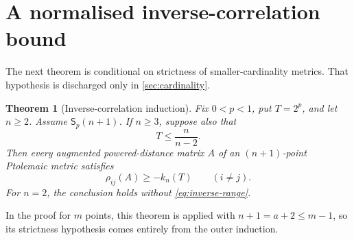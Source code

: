 \documentclass[11pt,a4paper]{article}
\newtheorem{theorem}{Theorem}[section]
\theoremstyle{definition}
\theoremstyle{remark}
\numberwithin{equation}{section}
\newcommand{\stp}{\mathsf{S}_p}
\begin{document}
\section{A normalised inverse-correlation bound}\label{sec:correlation}
The next theorem is conditional on strictness of smaller-cardinality metrics. That hypothesis is discharged only in \cref{sec:cardinality}.

\begin{theorem}[Inverse-correlation induction]\label{thm:inverse-bound}
Fix $0<p<1$, put $T=2^p$, and let $n\ge2$. Assume $\stp(n+1)$. If $n\ge3$, suppose also that
\begin{equation}\label{eq:inverse-range}
 T\le\frac n{n-2}.
\end{equation}
Then every augmented powered-distance matrix $A$ of an $(n+1)$-point Ptolemaic metric satisfies
\begin{equation}\label{eq:inverse-bound}
 \rho_{ij}(A)\ge-k_n(T)\qquad(i\ne j).
\end{equation}
For $n=2$, the conclusion holds without \eqref{eq:inverse-range}.
\end{theorem}
\noindent In the proof for $m$ points, this theorem is applied with $n+1=a+2\le m-1$, so its strictness hypothesis comes entirely from the outer induction.
\end{document}
